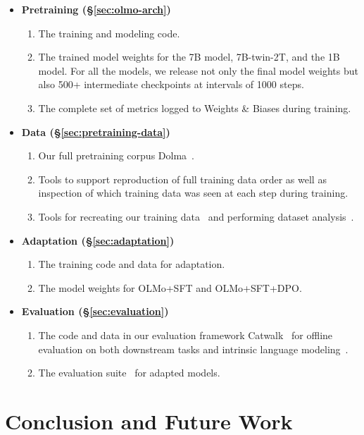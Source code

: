 \documentclass[11pt]{article}
\begin{document}
\begin{itemize}[noitemsep,leftmargin=4.5mm,beginpenalty=10000]
    \item \textbf{Pretraining (\S\ref{sec:olmo-arch})} 
    \begin{enumerate}
        \item The training and modeling code.
        \item The trained model weights for the 7B model, 7B-twin-2T, and the 1B model. For all the models, we release not only the final model weights but also 500+ intermediate checkpoints at intervals of 1000 steps.
        \item The complete set of metrics logged to Weights \& Biases during training.
    \end{enumerate}
    \item \textbf{Data (\S\ref{sec:pretraining-data})} 
    \begin{enumerate}
        \item Our full pretraining corpus Dolma~\citep{dolma}.
        \item Tools to support reproduction of full training data order as well as inspection of which training data was seen at each step during training.
        \item Tools for recreating our training data~\citep{dolma} and performing dataset analysis~\citep{wimbd}.
    \end{enumerate}
    \item \textbf{Adaptation (\S\ref{sec:adaptation})}
    \begin{enumerate}
        \item The training code and data for adaptation.
        \item The model weights for OLMo+SFT and OLMo+SFT+DPO.
    \end{enumerate}
    \item \textbf{Evaluation (\S\ref{sec:evaluation})}
    \begin{enumerate}
        \item The code and data in our evaluation framework Catwalk~\citep{groeneveld2023catwalk} for offline evaluation on both downstream tasks and intrinsic language modeling~\citep{magnusson2023paloma}.
        \item The evaluation suite~\citep{wang2023far,ivison2023camels} for adapted models.
    \end{enumerate}
\end{itemize}

\section{Conclusion and Future Work}
\end{document}
